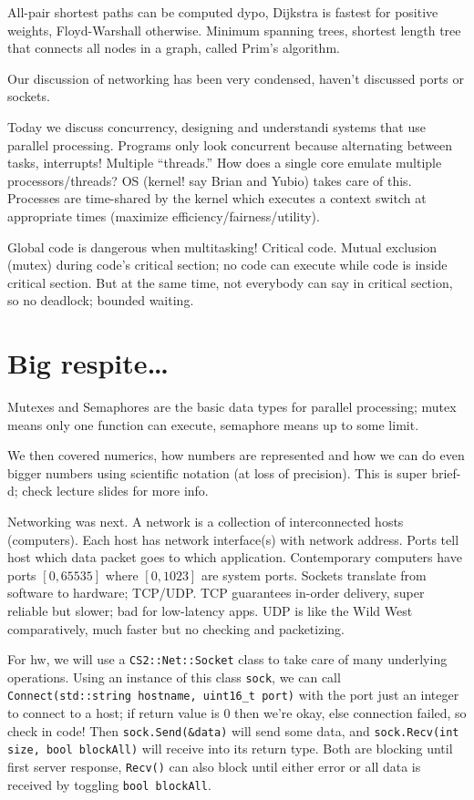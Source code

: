 \documentclass[10pt, twocolumn]{article}
\begin{document}
All-pair shortest paths can be computed dypo, Dijkstra is fastest for positive weights, Floyd-Warshall otherwise. Minimum spanning trees, shortest length tree that connects all nodes in a graph, called Prim's algorithm.

Our discussion of networking has been very condensed, haven't discussed ports or sockets. 

Today we discuss concurrency, designing and understandi systems that use parallel processing. Programs only look concurrent because alternating between tasks, interrupts! Multiple ``threads.'' How does a single core emulate multiple processors/threads? OS (kernel! say Brian and Yubio) takes care of this. Processes are time-shared by the kernel which executes a context switch at appropriate times (maximize efficiency/fairness/utility).

Global code is dangerous when multitasking! Critical code. Mutual exclusion (mutex) during code's critical section; no code can execute while code is inside critical section. But at the same time, not everybody can say in critical section, so no deadlock; bounded waiting.

\section{Big respite\dots}

Mutexes and Semaphores are the basic data types for parallel processing; mutex means only one function can execute, semaphore means up to some limit. 

We then covered numerics, how numbers are represented and how we can do even bigger numbers using scientific notation (at loss of precision). This is super brief-d; check lecture slides for more info.

Networking was next. A network is a collection of interconnected hosts (computers). Each host has network interface(s) with network address. Ports tell host which data packet goes to which application. Contemporary computers have ports $[0, 65535]$ where $[0,1023]$ are system ports. Sockets translate from software to hardware; TCP/UDP. TCP guarantees in-order delivery, super reliable but slower; bad for low-latency apps. UDP is like the Wild West comparatively, much faster but no checking and packetizing.

For hw, we will use a \texttt{CS2::Net::Socket} class to take care of many underlying operations. Using an instance of this class \texttt{sock}, we can call \texttt{Connect(std::string hostname, uint16\_t port)} with the port just an integer to connect to a host; if return value is $0$ then we're okay, else connection failed, so check in code! Then \texttt{sock.Send(\&data)} will send some data, and \texttt{sock.Recv(int size, bool blockAll)} will receive into its return type. Both are blocking until first server response, \texttt{Recv()} can also block until either error or all data is received by toggling \texttt{bool blockAll}.
\end{document}
